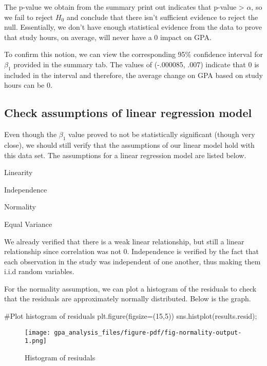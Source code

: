\documentclass[
  letterpaper,
  DIV=11,
  numbers=noendperiod]{scrreprt}
\newenvironment{Shaded}{\begin{snugshade}}{\end{snugshade}}
\newcommand{\CommentTok}[1]{\textcolor[rgb]{0.37,0.37,0.37}{#1}}
\newcommand{\DecValTok}[1]{\textcolor[rgb]{0.68,0.00,0.00}{#1}}
\newcommand{\NormalTok}[1]{\textcolor[rgb]{0.00,0.23,0.31}{#1}}
\newcommand{\OperatorTok}[1]{\textcolor[rgb]{0.37,0.37,0.37}{#1}}
\begin{document}
The p-value we obtain from the summary print out indicates that p-value
\textgreater{} \(\alpha\), so we fail to reject \(H_0\) and conclude
that there isn't sufficient evidence to reject the null. Essentially, we
don't have enough statistical evidence from the data to prove that study
hours, on average, will never have a 0 impact on GPA.

To confirm this notion, we can view the corresponding 95\% confidence
interval for \(\beta_1\) provided in the summary tab. The values of
(-.000085, .007) indicate that 0 is included in the interval and
therefore, the average change on GPA based on study hours can be 0.

\hypertarget{check-assumptions-of-linear-regression-model}{%
\subsection{Check assumptions of linear regression
model}\label{check-assumptions-of-linear-regression-model}}

Even though the \(\beta_1\) value proved to not be statistically
significant (though very close), we should still verify that the
assumptions of our linear model hold with this data set. The assumptions
for a linear regression model are listed below.

Linearity

Independence

Normality

Equal Variance

We already verified that there is a weak linear relationship, but still
a linear relationship since correlation was not 0. Independence is
verified by the fact that each observation in the study was independent
of one another, thus making them i.i.d random variables.

For the normality assumption, we can plot a histogram of the residuals
to check that the residuals are approximately normally distributed.
Below is the graph.

\begin{Shaded}
\begin{Highlighting}[]
\CommentTok{\#Plot histogram of residuals}
\NormalTok{plt.figure(figsize}\OperatorTok{=}\NormalTok{(}\DecValTok{15}\NormalTok{,}\DecValTok{5}\NormalTok{))}
\NormalTok{sns.histplot(results.resid)}\OperatorTok{;}
\end{Highlighting}
\end{Shaded}

\begin{figure}[H]

{\centering \texttt{[image: gpa\_analysis\_files/figure-pdf/fig-normality-output-1.png]}

}

\caption{\label{fig-normality}Histogram of resiudals}

\end{figure}
\end{document}
